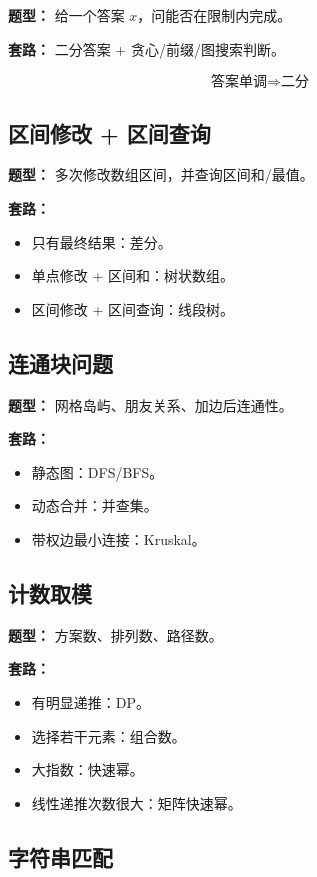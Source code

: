 \documentclass[UTF8,a4paper,14pt]{ctexart}
\begin{document}
\textbf{题型：}
给一个答案 $x$，问能否在限制内完成。

\textbf{套路：}
二分答案 + 贪心/前缀/图搜索判断。

\[
\text{答案单调} \Rightarrow \text{二分}
\]

\subsection{区间修改 + 区间查询}

\textbf{题型：}
多次修改数组区间，并查询区间和/最值。

\textbf{套路：}
\begin{itemize}
  \item 只有最终结果：差分。
  \item 单点修改 + 区间和：树状数组。
  \item 区间修改 + 区间查询：线段树。
\end{itemize}

\subsection{连通块问题}

\textbf{题型：}
网格岛屿、朋友关系、加边后连通性。

\textbf{套路：}
\begin{itemize}
  \item 静态图：DFS/BFS。
  \item 动态合并：并查集。
  \item 带权边最小连接：Kruskal。
\end{itemize}

\subsection{计数取模}

\textbf{题型：}
方案数、排列数、路径数。

\textbf{套路：}
\begin{itemize}
  \item 有明显递推：DP。
  \item 选择若干元素：组合数。
  \item 大指数：快速幂。
  \item 线性递推次数很大：矩阵快速幂。
\end{itemize}

\subsection{字符串匹配}
\end{document}
